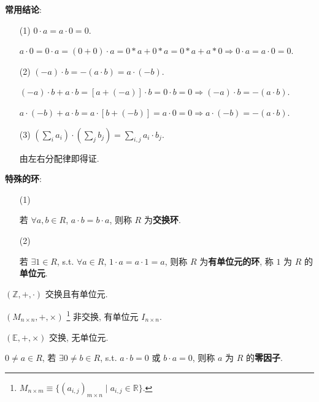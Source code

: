 \documentclass{note}
\begin{document}
\textbf{常用结论}:
\begin{itemize}
    \item[(1)] $0\cdot a=a\cdot 0=0$.
    \begin{pf}
        $a\cdot 0=0\cdot a=(0+0)\cdot a=0*a+0*a=0*a+a*0\Longrightarrow 0\cdot a=a\cdot 0=0$.
    \end{pf}
    \item[(2)] $(-a)\cdot b=-(a\cdot b)=a\cdot(-b)$.
    \begin{pf}
        $(-a)\cdot b+a\cdot b=[a+(-a)]\cdot b=0\cdot b=0\Longrightarrow (-a)\cdot b=-(a\cdot b)$.

        $a\cdot(-b)+a\cdot b=a\cdot[b+(-b)]=a\cdot 0=0\Longrightarrow a\cdot(-b)=-(a\cdot b)$.
    \end{pf}
    \item[(3)] $\left(\sum_ia_i\right)\cdot\left(\sum_jb_j\right)=\sum_{i,j}a_i\cdot b_j$.
    \begin{pf}
        由左右分配律即得证.
    \end{pf}
\end{itemize}

\textbf{特殊的环}:
\begin{itemize}
    \item[(1)] ~\begin{df}[交换环]
        若 $\forall a,b\in R$, $a\cdot b=b\cdot a$, 则称 $R$ 为\textbf{交换环}.
    \end{df}
    \item[(2)] ~\begin{df}[有单位元的环]
        若 $\exists 1\in R$, s.t. $\forall a\in R$, $1\cdot a=a\cdot 1=a$, 则称 $R$ 为\textbf{有单位元的环}, 称 $1$ 为 $R$ 的\textbf{单位元}.
    \end{df}
\end{itemize}

\begin{eg}
    $(\mathbb{Z},+,\cdot)$ 交换且有单位元.
\end{eg}

\begin{eg}
    $(M_{n\times n},+,\times)$ \footnote{$M_{n\times m}\equiv\{(a_{i,j})_{m\times n}\mid a_{i,j}\in\mathbb{R}\}$.} 非交换, 有单位元 $I_{n\times n}$.
\end{eg}

\begin{eg}
    $(\mathbb{E},+,\times)$ 交换, 无单位元.
\end{eg}

\begin{df}[零因子]
    $0\neq a\in R$, 若 $\exists 0\neq b\in R$, s.t. $a\cdot b=0$ 或 $b\cdot a=0$, 则称 $a$ 为 $R$ 的\textbf{零因子}.
\end{df}
\end{document}

